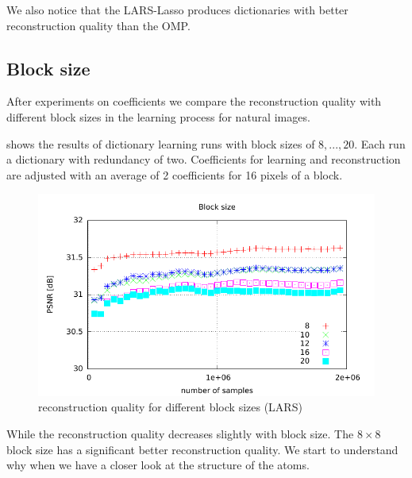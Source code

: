 We also notice that the LARS-Lasso produces dictionaries with better
reconstruction quality than the OMP.





\subsection{Block size}
After experiments on coefficients we compare the reconstruction quality
with different block sizes in the learning process for natural images. 

 shows the results of dictionary
learning runs with block sizes of $8,...,20$. 
Each run a dictionary with redundancy of two. Coefficients for learning
and reconstruction are adjusted with an average of 2 coefficients for 16 pixels
of a block.

\begin{figure}[h]
\centering
\includegraphics[width =
1.0\textwidth]{../tests/results/blockSizeConverg.pdf}
\caption{reconstruction quality for different block sizes (LARS)}
\label{fig:blockSize}
\end{figure}

While the reconstruction quality decreases slightly with block size. 
The $8\times8$ block size has a significant better reconstruction quality. 
We start to understand why when we have a closer look at the structure of
the atoms. 

